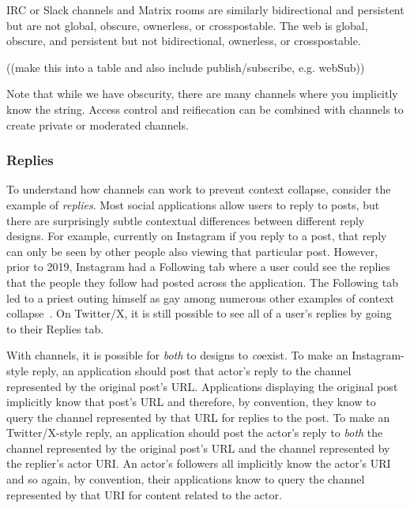 IRC or Slack channels and Matrix rooms are similarly bidirectional and persistent
but are not global, obscure, ownerless, or crosspostable.
The web is global, obscure, and persistent
but not bidirectional, ownerless, or crosspostable.

((make this into a table and also include publish/subscribe, e.g. webSub))

Note that while we have obscurity, there are many channels where you implicitly know
the string.
Access control and reifiecation can be combined with channels to create private
or moderated channels.



\subsubsection{Replies}

To understand how channels can work to prevent context collapse, consider the example of \emph{replies}.
Most social applications allow users to reply to posts, but there are surprisingly subtle
contextual differences between different reply designs.
For example, currently on Instagram
if you reply to a post, that reply can only be seen by other
people also viewing that particular post.
However, prior to 2019, Instagram had a Following tab where a user could see
the replies that the people they follow had posted across the application.
The Following tab led to a priest outing himself as gay among numerous other
examples of context collapse~\cite{instagramfollowingtab}.
On Twitter/X, it is still possible to see all of a user's replies by going
to their Replies tab.

With channels, it is possible for \emph{both} to designs to \emph{co}exist.
To make an Instagram-style reply,
an application should post that actor's reply to the channel
represented by the original post's URL.
Applications displaying the original post implicitly know that post's
URL and therefore,
by convention, they know to query the channel represented by that URL
for replies to the post.
To make an Twitter/X-style reply, an application should post the
actor's reply to \emph{both} the channel represented by the original post's URL
and the channel represented by the replier's actor URI.
An actor's followers all implicitly know the actor's URI and so
again, by convention, their applications know to query the channel represented by that URI
for content related to the actor.

